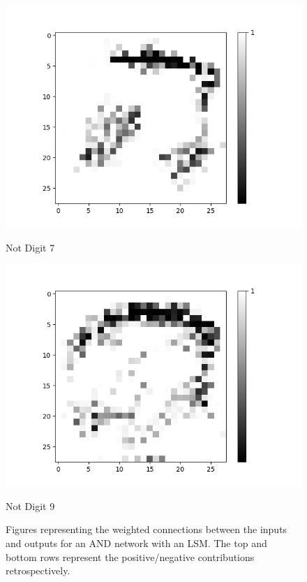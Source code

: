 \begin{figure}[H]
\begin{minipage}[b]{0.19\textwidth}
		\includegraphics[width=\textwidth]{AND(LSM)/Negative/Layer0-Neuron-7.png}
		\caption{Not Digit 7}
	\end{minipage}
	\begin{minipage}[b]{0.19\textwidth}
		\captionsetup{labelformat=empty}
		\includegraphics[width=\textwidth]{AND(LSM)/Negative/Layer0-Neuron-9.png}
		\caption{Not Digit 9}
	\end{minipage}
	\hfill
	\caption{Figures representing the weighted connections between the inputs and outputs for an AND network with an LSM. The top and bottom rows represent the positive/negative contributions retrospectively.}
	\label{fig:and-net-new-archetchure-with-lsm-interp}
\end{figure}

